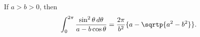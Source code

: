 If $a > b > 0$, then
\[
\int_{0}^{2\pi} \frac{\sin^{2}\theta\, d\theta}{a - b\cos\theta}
  = \frac{2\pi}{b^{2}} \{a - \sqrtp{a^{2} - b^{2}}\}.
\]

